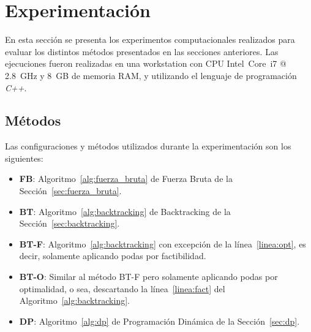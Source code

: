 \documentclass[10pt,a4paper]{article}
\begin{document}
\section{Experimentación} \label{sec:experimentacion}
En esta sección se presenta los experimentos computacionales realizados para evaluar los distintos métodos presentados en las secciones anteriores. Las ejecuciones fueron realizadas en una workstation con CPU Intel~Core~i7 @ 2.8~GHz y 8~GB de memoria RAM, y utilizando el lenguaje de programación \emph{C++}.

\subsection{Métodos}
Las configuraciones y métodos utilizados durante la experimentación son los siguientes:
\begin{itemize}
    \setlength{\itemsep}{1pt}
    \setlength{\parskip}{0pt}
    \setlength{\parsep}{0pt}
    \item \textbf{FB}: Algoritmo~\ref{alg:fuerza_bruta} de Fuerza Bruta de la Sección~\ref{sec:fuerza_bruta}.
    \item \textbf{BT}: Algoritmo~\ref{alg:backtracking} de Backtracking de la Sección~\ref{sec:backtracking}.
    \item \textbf{BT-F}: Algoritmo~\ref{alg:backtracking} con excepción de la línea~\ref{linea:opt}, es decir, solamente aplicando podas por factibilidad.
    \item \textbf{BT-O}: Similar al método BT-F pero solamente aplicando podas por optimalidad, o sea, descartando la línea~\ref{linea:fact} del Algoritmo~\ref{alg:backtracking}.
    \item \textbf{DP}: Algoritmo~\ref{alg:dp} de Programación Dinámica de la Sección~\ref{sec:dp}.
\end{itemize}
\end{document}

